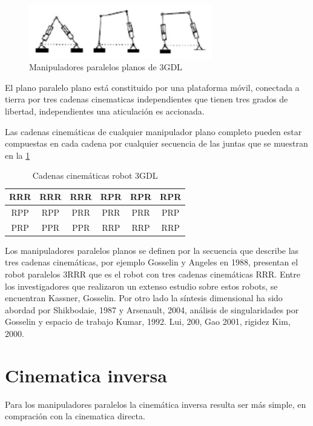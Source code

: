 \documentclass[letter,openrigh,12pt,spanish]{report}
\begin{document}
\begin{figure}[htp]
\centering
\includegraphics[width=8cm]{2.jpg}
\caption{Manipuladores paralelos planos de 3GDL}
\label{Figure 2}
\end{figure}

El plano paralelo plano est\'a constituido por una plataforma m\'ovil, conectada a tierra por tres cadenas cinematicas independientes que tienen tres grados de libertad, independientes una aticulaci\'on es accionada.

Las cadenas cinem\'aticas de cualquier manipulador plano completo pueden estar compuestas en cada cadena por cualquier secuencia de las juntas que se muestran en la \ref{Tabla 1}

\begin{center}
\begin{table}
\begin{tabular}{|c|c|c|c|c|c|}
\hline
	RRR & RRR & RRR & RPR &  RPR & RPR\\
\hline
	RPP & RPP & PRR & PRR & PRR & PRP\\
\hline
	PRP & PPR & PPR & RRP & RRP & RRP\\
\hline
\end{tabular}
\caption{Cadenas cinem\'aticas robot 3GDL}
\label{Tabla 1}
\end{table}
\end{center}

Los manipuladores paralelos planos se definen por la secuencia que describe las tres cadenas cinem\'aticas, por ejemplo Gosselin y Angeles en 1988, presentan el robot paralelos 3RRR que es el robot con tres cadenas cinem\'aticas RRR. Entre los investigadores que realizaron un extenso estudio sobre estos robots, se encuentran Kassner, Gosselin. Por otro lado la s\'intesis dimensional ha sido abordad por Shikbodaie, 1987 y Arsenault, 2004, an\'alisis de singularidades por Gosselin y espacio de trabajo Kumar, 1992. Lui, 200, Gao 2001, rigidez Kim, 2000.

\section{Cinematica inversa}

Para los manipuladores paralelos la cinem\'atica inversa resulta ser m\'as simple, en compraci\'on con la cinematica directa.
\end{document}
